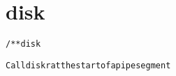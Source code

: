 \section{disk}
\begin{shaded}
\begin{alltt}
/** disk

  Call diskr at the start of a pipe segment

\end{alltt}
\end{shaded}
